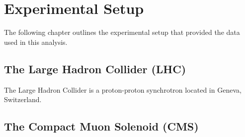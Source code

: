 \chapter{Experimental Setup}
\label{chap::ExperimentalSetup}
The following chapter outlines the experimental setup that provided the data used in this analysis. 
\section{The Large Hadron Collider (LHC)}
The Large Hadron Collider is a proton-proton synchrotron located in Geneva, Switzerland. 
\section{The Compact Muon Solenoid (CMS)}
